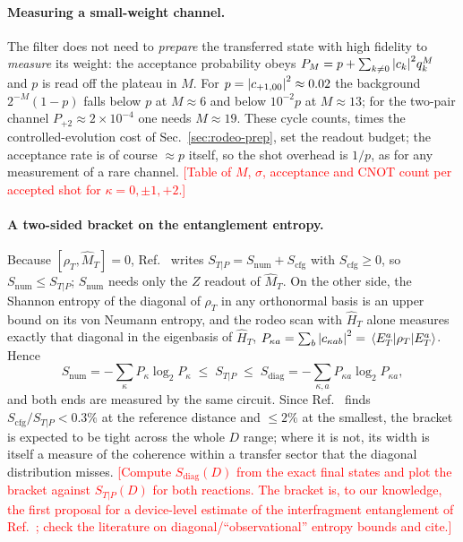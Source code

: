 \documentclass[
  aps,
  prc,
  reprint,
  superscriptaddress,
  floatfix,
  nofootinbib
]{revtex4-2}
\newcommand{\todo}[1]{\textcolor{red}{[#1]}}
\newcommand{\HT}{\hat H_{T}}
\newcommand{\Snum}{S_{\mathrm{num}}}
\newcommand{\Scfg}{S_{\mathrm{cfg}}}
\newcommand{\Sdiag}{S_{\mathrm{diag}}}
\begin{document}
\paragraph{Measuring a small-weight channel.}
The filter does not need to \emph{prepare} the transferred state with high
fidelity to \emph{measure} its weight: the acceptance probability obeys
$P_M=p+\sum_{k\neq0}\abs{c_k}^2q_k^M$ and $p$ is read off the plateau in
$M$.  For $p=\abs{c_{+1,00}}^2\approx0.02$ the background $2^{-M}(1-p)$
falls below $p$ at $M\approx6$ and below $10^{-2}p$ at $M\approx13$; for the
two-pair channel $P_{+2}\approx2\times10^{-4}$ one needs $M\approx19$.
These cycle counts, times the controlled-evolution cost of
Sec.~\ref{sec:rodeo-prep}, set the readout budget; the acceptance rate is of
course $\approx p$ itself, so the shot overhead is $1/p$, as for any
measurement of a rare channel.  \todo{Table of $M$, $\sigma$, acceptance
and CNOT count per accepted shot for $\kappa=0,\pm1,+2$.}

\paragraph{A two-sided bracket on the entanglement entropy.}
Because $[\rho_T,\hat M_T]=0$, Ref.~\cite{TwoFragment2026} writes
$S_{T|P}=\Snum+\Scfg$ with $\Scfg\ge0$, so $\Snum\le S_{T|P}$; $\Snum$ needs
only the $Z$ readout of $\hat M_T$.  On the other side, the Shannon entropy
of the diagonal of $\rho_T$ in any orthonormal basis is an upper bound on
its von Neumann entropy, and the rodeo scan with $\HT$ alone measures
exactly that diagonal in the eigenbasis of $\HT$,
$P_{\kappa a}=\sum_b\abs{c_{\kappa ab}}^2=\mel{E^a_T}{\rho_T}{E^a_T}$.
Hence
\begin{equation}
  \Snum=-\sum_\kappa P_\kappa\log_2P_\kappa\;\le\;S_{T|P}\;\le\;
  \Sdiag=-\sum_{\kappa,a}P_{\kappa a}\log_2P_{\kappa a},
  \label{eq:bracket}
\end{equation}
and both ends are measured by the same circuit.  Since
Ref.~\cite{TwoFragment2026} finds $\Scfg/S_{T|P}<0.3\%$ at the reference
distance and $\le2\%$ at the smallest, the bracket is expected to be tight
across the whole $D$ range; where it is not, its width is itself a measure
of the coherence within a transfer sector that the diagonal distribution
misses.  \todo{Compute $\Sdiag(D)$ from the exact final states and plot the
bracket against $S_{T|P}(D)$ for both reactions.  The bracket is, to our
knowledge, the first proposal for a device-level estimate of the
interfragment entanglement of Ref.~\cite{TwoFragment2026}; check the
literature on diagonal/``observational'' entropy bounds and cite.}
\end{document}
